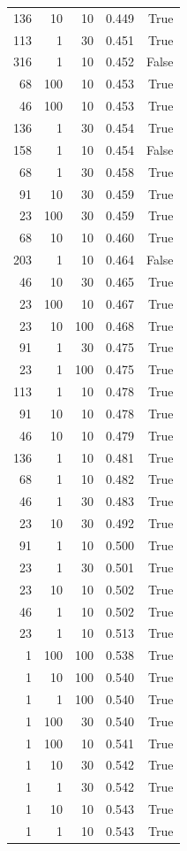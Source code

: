 \begin{tabular}{rrrrr}
136 & 10 & 10 & 0.449 & True \\
113 & 1 & 30 & 0.451 & True \\
316 & 1 & 10 & 0.452 & False \\
68 & 100 & 10 & 0.453 & True \\
46 & 100 & 10 & 0.453 & True \\
136 & 1 & 30 & 0.454 & True \\
158 & 1 & 10 & 0.454 & False \\
68 & 1 & 30 & 0.458 & True \\
91 & 10 & 30 & 0.459 & True \\
23 & 100 & 30 & 0.459 & True \\
68 & 10 & 10 & 0.460 & True \\
203 & 1 & 10 & 0.464 & False \\
46 & 10 & 30 & 0.465 & True \\
23 & 100 & 10 & 0.467 & True \\
23 & 10 & 100 & 0.468 & True \\
91 & 1 & 30 & 0.475 & True \\
23 & 1 & 100 & 0.475 & True \\
113 & 1 & 10 & 0.478 & True \\
91 & 10 & 10 & 0.478 & True \\
46 & 10 & 10 & 0.479 & True \\
136 & 1 & 10 & 0.481 & True \\
68 & 1 & 10 & 0.482 & True \\
46 & 1 & 30 & 0.483 & True \\
23 & 10 & 30 & 0.492 & True \\
91 & 1 & 10 & 0.500 & True \\
23 & 1 & 30 & 0.501 & True \\
23 & 10 & 10 & 0.502 & True \\
46 & 1 & 10 & 0.502 & True \\
23 & 1 & 10 & 0.513 & True \\
1 & 100 & 100 & 0.538 & True \\
1 & 10 & 100 & 0.540 & True \\
1 & 1 & 100 & 0.540 & True \\
1 & 100 & 30 & 0.540 & True \\
1 & 100 & 10 & 0.541 & True \\
1 & 10 & 30 & 0.542 & True \\
1 & 1 & 30 & 0.542 & True \\
1 & 10 & 10 & 0.543 & True \\
1 & 1 & 10 & 0.543 & True \\
\bottomrule
\end{tabular}
